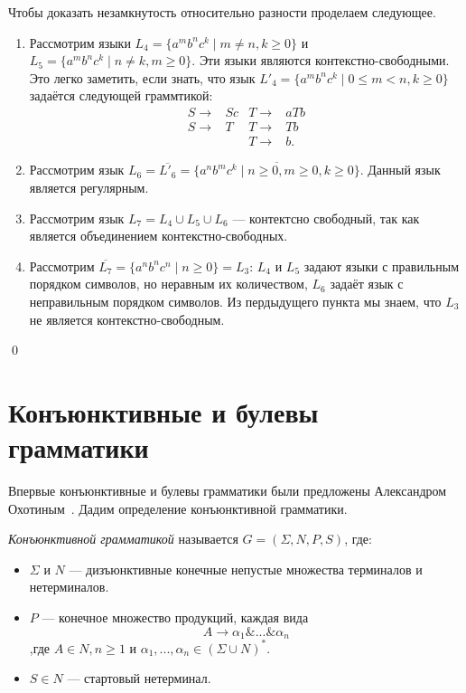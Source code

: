 Чтобы доказать незамкнутость относительно разности проделаем следующее.
\begin{enumerate}
\item Рассмотрим языки $L_4 = \{a^m b^n c^k \mid m \neq n, k \geq 0\}$ и $L_5 = \{a^m b^n c^k \mid n \neq k, m \geq 0\}$. 
Эти языки являются контекстно-свободными.
Это легко заметить, если знать, что язык $L'_4 = \{a^m b^n c^k \mid 0 \leq m < n, k \geq 0\}$ задаётся следующей граммтикой:
\begin{align*}
S \to & S c & T \to & a T b \\
S \to & T &   T \to & T b \\
      &   &   T \to & b. 
\end{align*} 

\item Рассмотрим язык $L_6 = \overline{L'_6} = \overline{\{a^n b^m c^k \mid n \geq 0, m \geq 0, k \geq 0\}}$. Данный язык является регулярным.

\item Рассмотрим язык $L_7 = L_4 \cup L_5 \cup L_6$ --- контектсно свободный, так как является объединением контекстно-свободных.

\item Рассмотрим $\overline{L_7} = \{a^n b^n c^n \mid n \geq 0\} = L_3$: $L_4$ и $L_5$ задают языки с правильным порядком символов, но неравным их количеством, $L_6$ задаёт язык с неправильным порядком символов. 
Из пердыдущего пункта мы знаем, что $L_3$  не является контекстно-свободным.

\end{enumerate}

\qed

\section{Конъюнктивные и булевы грамматики}

Впервые конъюнктивные и булевы грамматики были предложены Александром Охотиным~\cite{DBLP:journals/jalc/Okhotin01,Okhotin:2003:BG:1758089.1758123}. Дадим определение конъюнктивной грамматики.

\begin{definition}
    \textit{Конъюнктивной грамматикой} называется $G = (\Sigma,N,P,S)$, где:
    \begin{itemize}
        \item $\Sigma$ и $N$ --- дизъюнктивные конечные непустые множества терминалов и нетерминалов.
        \item $P$ --- конечное множество продукций, каждая вида
        \[
        A\rightarrow \alpha_1\&...\&\alpha_n
        \]
        ,где $A \in N,n \geq 1$ и $\alpha_1,...,\alpha_n \in (\Sigma \cup N)^*$.
        \item $S \in N$  --- стартовый нетерминал.
    \end{itemize}
\end{definition}

